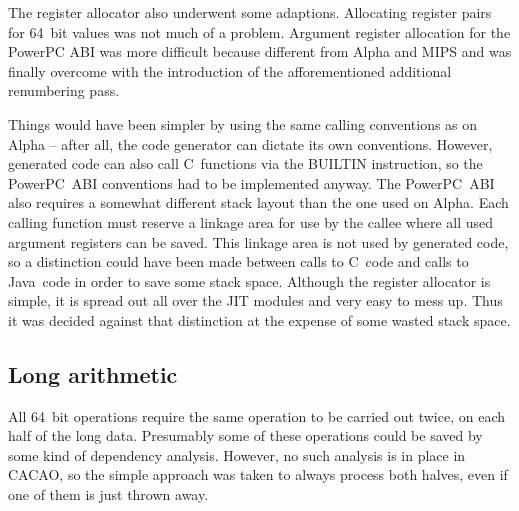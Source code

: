 The register allocator also underwent some adaptions. Allocating register pairs
for 64~bit values was not much of a problem. Argument register allocation for
the PowerPC ABI was more difficult because different from Alpha and MIPS and
was finally overcome with the introduction of the afforementioned additional
renumbering pass.

Things would have been simpler by using the same calling conventions as on
Alpha -- after all, the code generator can dictate its own conventions.
However, generated code can also call C~functions via the BUILTIN instruction,
so the PowerPC~ABI conventions had to be implemented anyway. The PowerPC~ABI
also requires a somewhat different stack layout than the one used on Alpha.
Each calling function must reserve a linkage area for use by the callee where
all used argument registers can be saved. This linkage area is not used by
generated code, so a distinction could have been made between calls to C~code
and calls to Java~code in order to save some stack space. Although the register
allocator is simple, it is spread out all over the JIT modules and very easy to
mess up. Thus it was decided against that distinction at the expense of some
wasted stack space.

\subsection{Long arithmetic}

All 64~bit operations require the same operation to be carried out twice, on
each half of the long data. Presumably some of these operations could be saved
by some kind of dependency analysis. However, no such analysis is in place in
CACAO, so the simple approach was taken to always process both halves, even if
one of them is just thrown away.
